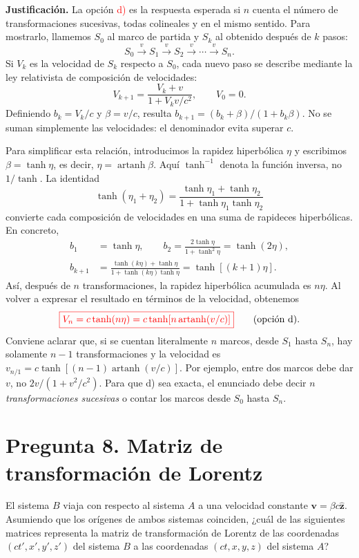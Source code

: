 \documentclass[a4paper,11pt]{article}
\newcommand{\pregunta}[2]{\section*{Pregunta #1. #2}}
\begin{document}
\textbf{Justificación.} La opción \textcolor{red}{d)} es la respuesta esperada si $n$ cuenta el número de transformaciones sucesivas, todas colineales y en el mismo sentido. Para mostrarlo, llamemos $S_0$ al marco de partida y $S_k$ al obtenido después de $k$ pasos:
\[
S_0\xrightarrow{\ v\ }S_1\xrightarrow{\ v\ }S_2
\xrightarrow{\ v\ }\cdots\xrightarrow{\ v\ }S_n.
\]
Si $V_k$ es la velocidad de $S_k$ respecto a $S_0$, cada nuevo paso se describe mediante la ley relativista de composición de velocidades:
\[
V_{k+1}=\frac{V_k+v}{1+V_kv/c^2},\qquad V_0=0.
\]
Definiendo $b_k=V_k/c$ y $\beta=v/c$, resulta $b_{k+1}=(b_k+\beta)/(1+b_k\beta)$. No se suman simplemente las velocidades: el denominador evita superar $c$.

Para simplificar esta relación, introducimos la rapidez hiperbólica $\eta$ y escribimos $\beta=\tanh\eta$, es decir, $\eta=\operatorname{artanh}\beta$. Aquí $\tanh^{-1}$ denota la función inversa, no $1/\tanh$. La identidad
\[
\tanh(\eta_1+\eta_2)
=\frac{\tanh\eta_1+\tanh\eta_2}{1+\tanh\eta_1\tanh\eta_2}
\]
convierte cada composición de velocidades en una suma de rapideces hiperbólicas. En concreto,
\[
\begin{aligned}
b_1&=\tanh\eta,\qquad b_2=\frac{2\tanh\eta}{1+\tanh^2\eta}=\tanh(2\eta),\\
b_{k+1}&=\frac{\tanh(k\eta)+\tanh\eta}{1+\tanh(k\eta)\tanh\eta}
=\tanh[(k+1)\eta].
\end{aligned}
\]
Así, después de $n$ transformaciones, la rapidez hiperbólica acumulada es $n\eta$. Al volver a expresar el resultado en términos de la velocidad, obtenemos
\[
\textcolor{red}{\boxed{V_n=c\tanh(n\eta)=c\tanh\!\left[n\operatorname{artanh}(v/c)\right]}}
\qquad\text{(opción d).}
\]
Conviene aclarar que, si se cuentan literalmente $n$ marcos, desde $S_1$ hasta $S_n$, hay solamente $n-1$ transformaciones y la velocidad es $v_{n/1}=c\tanh[(n-1)\operatorname{artanh}(v/c)]$. Por ejemplo, entre dos marcos debe dar $v$, no $2v/(1+v^2/c^2)$. Para que d) sea exacta, el enunciado debe decir \emph{$n$ transformaciones sucesivas} o contar los marcos desde $S_0$ hasta $S_n$.

\pregunta{8}{Matriz de transformación de Lorentz}

El sistema $B$ viaja con respecto al sistema $A$ a una velocidad constante $\mathbf{v}=\beta c\hat{\mathbf{z}}$. Asumiendo que los orígenes de ambos sistemas coinciden, ¿cuál de las siguientes matrices representa la matriz de transformación de Lorentz de las coordenadas $(ct',x',y',z')$ del sistema $B$ a las coordenadas $(ct,x,y,z)$ del sistema $A$?
\end{document}
